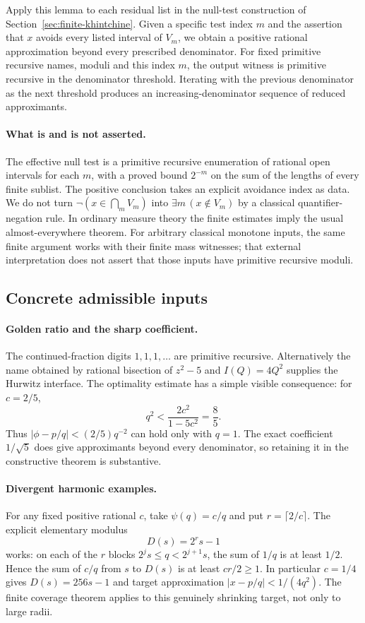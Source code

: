 Apply this lemma to each residual list in the null-test construction of
Section~\ref{sec:finite-khintchine}.  Given a specific test index $m$ and
the assertion that $x$ avoids every listed interval of $V_m$, we obtain
a positive rational approximation beyond every prescribed denominator.
For fixed primitive recursive names, moduli and this index $m$, the
output witness is primitive recursive in the denominator threshold.
Iterating with the previous denominator as the next threshold produces
an increasing-denominator sequence of reduced approximants.

\paragraph{What is and is not asserted.}
The effective null test is a primitive recursive enumeration of rational
open intervals for each $m$, with a proved bound $2^{-m}$ on the sum of
the lengths of every finite sublist.  The positive conclusion takes an
explicit avoidance index as data.  We do not turn
$\neg(x\in\bigcap_m V_m)$ into $\exists m\,(x\notin V_m)$ by a
classical quantifier-negation rule.  In ordinary measure theory the
finite estimates imply the usual almost-everywhere theorem.  For arbitrary
classical monotone inputs, the same finite argument works with their
finite mass witnesses; that external interpretation does not assert
that those inputs have primitive recursive moduli.

\subsection{Concrete admissible inputs}

\paragraph{Golden ratio and the sharp coefficient.}
The continued-fraction digits $1,1,1,\ldots$ are primitive recursive.
Alternatively the name obtained by rational bisection of $z^2-5$ and
$I(Q)=4Q^2$ supplies the Hurwitz interface.  The optimality estimate has
a simple visible consequence: for $c=2/5$,
\[
 q^2<\frac{2c^2}{1-5c^2}=\frac85.
\]
Thus $|\phi-p/q|<(2/5)q^{-2}$ can hold only with $q=1$.
The exact coefficient $1/\sqrt5$ does give approximants beyond every
denominator, so retaining it in the constructive theorem is substantive.

\paragraph{Divergent harmonic examples.}
For any fixed positive rational $c$, take $\psi(q)=c/q$ and put
$r=\lceil2/c\rceil$.  The explicit elementary modulus
\[
 D(s)=2^r s-1
\]
works: on each of the $r$ blocks
$2^j s\le q<2^{j+1}s$, the sum of $1/q$ is at least $1/2$.
Hence the sum of $c/q$ from $s$ to $D(s)$ is at least $cr/2\ge1$.
In particular $c=1/4$ gives $D(s)=256s-1$ and target approximation
$|x-p/q|<1/(4q^2)$.  The finite coverage theorem applies to this
genuinely shrinking target, not only to large radii.

